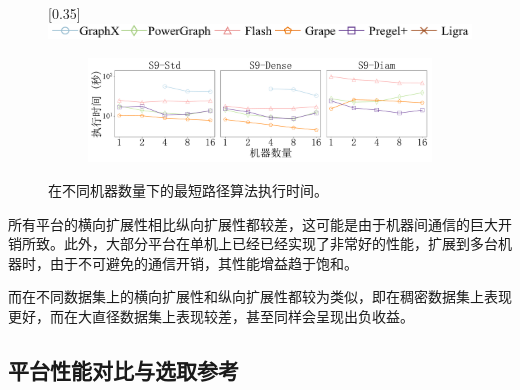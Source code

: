 \begin{figure}[h]\centering

    \scalebox{0.35}[0.35]{\includegraphics{figures/vertical_scalability_legend.pdf}}
    
    \begin{subfigure}[b]{0.8\textwidth}
        \includegraphics[width=\textwidth]{figures/sssp_horizontal_scalability_9_zh.pdf}
    \end{subfigure}

    \caption{在不同机器数量下的最短路径算法执行时间。}
    \label{fig:exp_scalability_machines_9}
\end{figure}

所有平台的横向扩展性相比纵向扩展性都较差，这可能是由于机器间通信的巨大开销所致。此外，大部分平台在单机上已经已经实现了非常好的性能，扩展到多台机器时，由于不可避免的通信开销，其性能增益趋于饱和。

而在不同数据集上的横向扩展性和纵向扩展性都较为类似，即在稠密数据集上表现更好，而在大直径数据集上表现较差，甚至同样会呈现出负收益。

\subsection{平台性能对比与选取参考}

